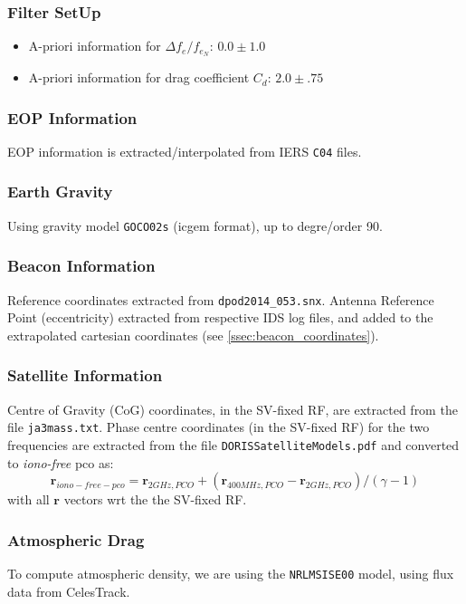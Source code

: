 \subsubsection{Filter SetUp}
\begin{itemize}
  \item A-priori information for $\Delta f_e / f_{e_N}$: $0.0 \pm 1.0$
  \item A-priori information for drag coefficient $C_{d}$: $2.0 \pm .75$
\end{itemize}

\subsubsection{EOP Information}
EOP information is extracted/interpolated from IERS \texttt{C04} files.

\subsubsection{Earth Gravity}
Using gravity model \texttt{GOCO02s} (icgem format), up to degre/order 90.

\subsubsection{Beacon Information}
Reference coordinates extracted from \texttt{dpod2014\_053.snx}. Antenna 
Reference Point (eccentricity) extracted from respective IDS log files, and 
added to the extrapolated cartesian coordinates (see 
\ref{ssec:beacon_coordinates}).

\subsubsection{Satellite Information}
Centre of Gravity (CoG) coordinates, in the SV-fixed RF, are extracted from the 
file \texttt{ja3mass.txt}. Phase centre coordinates (in the SV-fixed RF) for the 
two frequencies are extracted from the file \texttt{DORISSatelliteModels.pdf} and 
converted to \emph{iono-free} pco as:
\begin{equation}
  \bm{r}_{iono-free-pco} = \bm{r}_{2GHz,PCO} + (\bm{r}_{400MHz,PCO} - \bm{r}_{2GHz,PCO}) / (\gamma - 1)
\end{equation}
with all $\bm{r}$ vectors wrt the the SV-fixed RF.

\subsubsection{Atmospheric Drag}
To compute atmospheric density, we are using the \texttt{NRLMSISE00} model, 
using flux data from CelesTrack.

